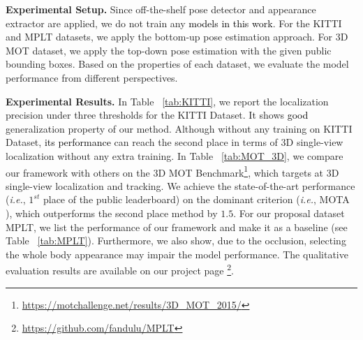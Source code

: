 \documentclass{article}
\newcommand{\ie}{{\it i.e.}}
\newcommand{\YangProof}[1]{\textcolor{black}{#1}}
\begin{document}
\noindent \textbf{Experimental Setup.}
Since off-the-shelf pose detector and appearance extractor are applied, we do not train any \YangProof{models in this work}. For the KITTI and MPLT datasets, we apply the bottom-up pose estimation approach. For 3D MOT dataset, we apply the top-down pose estimation with the given public bounding boxes. Based on the properties of each dataset, we evaluate the model performance from different perspectives. 

\noindent \textbf{Experimental Results.}
In Table ~\ref{tab:KITTI}, we report the localization precision under three thresholds for the KITTI Dataset. It shows \YangProof{good} generalization property of our method. Although without any training on KITTI Dataset, \YangProof{its performance} can reach the second place in terms of 3D single-view localization without any extra training. In Table ~\ref{tab:MOT_3D}, we compare our framework with others on the 3D MOT Benchmark\footnote{\url{https://motchallenge.net/results/3D_MOT_2015/}}, which targets at 3D single-view localization and tracking. We achieve the state-of-the-art performance (\ie, $1^{st}$ place of the public leaderboard) on the dominant criterion (\ie, MOTA \cite{ristani2016performance}), which outperforms the second place method by $1.5$. For our proposal dataset MPLT, we list the performance of our framework and make it as a baseline (see Table ~\ref{tab:MPLT}). Furthermore, we also show, due to the occlusion, selecting the whole body appearance may impair the model performance. The qualitative evaluation results are available on our project page \footnote{\url{https://github.com/fandulu/MPLT}}.

\vspace{-17px}
\begin{table}[!h]
\centering
\caption{Monocular-camera-based localization precision on KITTI Dataset. If distance from predicted locations to ground-truth location is within a threshold, it is correctly predicted.}
\label{tab:KITTI}
\end{table}
\end{document}
